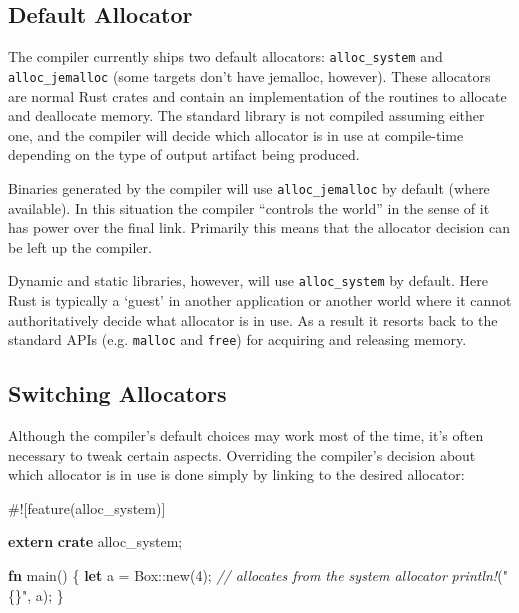 \documentclass[a4paper,]{book}
\newenvironment{Shaded}{\begin{snugshade}}{\end{snugshade}}
\newcommand{\KeywordTok}[1]{\textcolor[rgb]{0.13,0.29,0.53}{\textbf{{#1}}}}
\newcommand{\DataTypeTok}[1]{\textcolor[rgb]{0.13,0.29,0.53}{{#1}}}
\newcommand{\DecValTok}[1]{\textcolor[rgb]{0.00,0.00,0.81}{{#1}}}
\newcommand{\StringTok}[1]{\textcolor[rgb]{0.31,0.60,0.02}{{#1}}}
\newcommand{\CommentTok}[1]{\textcolor[rgb]{0.56,0.35,0.01}{\textit{{#1}}}}
\newcommand{\PreprocessorTok}[1]{\textcolor[rgb]{0.56,0.35,0.01}{\textit{{#1}}}}
\newcommand{\AttributeTok}[1]{\textcolor[rgb]{0.77,0.63,0.00}{{#1}}}
\newcommand{\NormalTok}[1]{{#1}}
\begin{document}
\subsection{Default Allocator}\label{default-allocator}

The compiler currently ships two default allocators:
\texttt{alloc\_system} and \texttt{alloc\_jemalloc} (some targets don't
have jemalloc, however). These allocators are normal Rust crates and
contain an implementation of the routines to allocate and deallocate
memory. The standard library is not compiled assuming either one, and
the compiler will decide which allocator is in use at compile-time
depending on the type of output artifact being produced.

Binaries generated by the compiler will use \texttt{alloc\_jemalloc} by
default (where available). In this situation the compiler ``controls the
world'' in the sense of it has power over the final link. Primarily this
means that the allocator decision can be left up the compiler.

Dynamic and static libraries, however, will use \texttt{alloc\_system}
by default. Here Rust is typically a `guest' in another application or
another world where it cannot authoritatively decide what allocator is
in use. As a result it resorts back to the standard APIs (e.g.
\texttt{malloc} and \texttt{free}) for acquiring and releasing memory.

\subsection{Switching Allocators}\label{switching-allocators}

Although the compiler's default choices may work most of the time, it's
often necessary to tweak certain aspects. Overriding the compiler's
decision about which allocator is in use is done simply by linking to
the desired allocator:

\begin{Shaded}
\begin{Highlighting}[]
\AttributeTok{#![}\NormalTok{feature}\AttributeTok{(}\NormalTok{alloc_system}\AttributeTok{)]}

\KeywordTok{extern} \KeywordTok{crate} \NormalTok{alloc_system;}

\KeywordTok{fn} \NormalTok{main() \{}
    \KeywordTok{let} \NormalTok{a = }\DataTypeTok{Box}\NormalTok{::new(}\DecValTok{4}\NormalTok{); }\CommentTok{// allocates from the system allocator}
    \PreprocessorTok{println!}\NormalTok{(}\StringTok{"\{\}"}\NormalTok{, a);}
\NormalTok{\}}
\end{Highlighting}
\end{Shaded}
\end{document}

